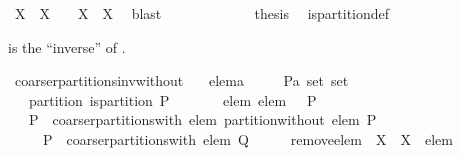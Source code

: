 \begin{isabellebody}
\ {\isachardoublequoteopen}{\isacharparenleft}X{}\ {\isasyminter}\ X{}\ {\isasymnoteq}\ {\isacharbraceleft}{\isacharbraceright}{\isacharparenright}\ {\isasymlongleftrightarrow}\ X{}\ {\isacharequal}\ X{}{\isachardoublequoteclose}\ \isamarkupfalse%
\ blast\isanewline
\ \ \ \ \isamarkupfalse%
\isanewline
\ \ \isamarkupfalse%
\isanewline
\ \ \isamarkupfalse%
\ \isamarkupfalse%
\ {\isacharquery}thesis\ \isamarkupfalse%
\ is{\isacharunderscore}partition{\isacharunderscore}def\ \isacommand{{\isachardot}}\isamarkupfalse%
\isanewline
{}\isamarkupfalse%
%
\endisatagproof
{\isafoldproof}%
%
\isadelimproof
%
\endisadelimproof
%
\begin{isamarkuptext}%
 is the ``inverse'' of 
  .%
\end{isamarkuptext}%
\isamarkuptrue%
\isamarkupfalse%
\ coarser{\isacharunderscore}partitions{\isacharunderscore}inv{\isacharunderscore}without{\isacharcolon}\isanewline
\ \ \ elem{\isacharcolon}{\isacharcolon}{\isacharprime}a\isanewline
\ \ \ \ \ P{\isacharcolon}{\isacharcolon}{\isachardoublequoteopen}{\isacharprime}a\ set\ set{\isachardoublequoteclose}\isanewline
\ \ \ partition{\isacharcolon}\ {\isachardoublequoteopen}is{\isacharunderscore}partition\ P{\isachardoublequoteclose}\isanewline
\ \ \ \ \ \ \ elem{\isacharcolon}\ {\isachardoublequoteopen}elem\ {\isasymin}\ {\isasymUnion}\ P{\isachardoublequoteclose}\ \isanewline
\ \ \ {\isachardoublequoteopen}P\ {\isasymin}\ coarser{\isacharunderscore}partitions{\isacharunderscore}with\ elem\ {\isacharparenleft}partition{\isacharunderscore}without\ elem\ P{\isacharparenright}{\isachardoublequoteclose}\isanewline
\ \ \ \ {\isacharparenleft}\ {\isachardoublequoteopen}P\ {\isasymin}\ coarser{\isacharunderscore}partitions{\isacharunderscore}with\ elem\ {\isacharquery}Q{\isachardoublequoteclose}{\isacharparenright}\isanewline
%
\isadelimproof
%
\endisadelimproof
%
\isatagproof
{}\isamarkupfalse%
\ {\isacharminus}\isanewline
\ \ \isamarkupfalse%
\ {\isacharquery}remove{\isacharunderscore}elem\ {\isacharequal}\ {\isachardoublequoteopen}{\isasymlambda}X\ {\isachardot}\ X\ {\isacharminus}\ {\isacharbraceleft}elem{\isacharbraceright}{\isachardoublequoteclose}\ \isanewline

\end{isabellebody}
